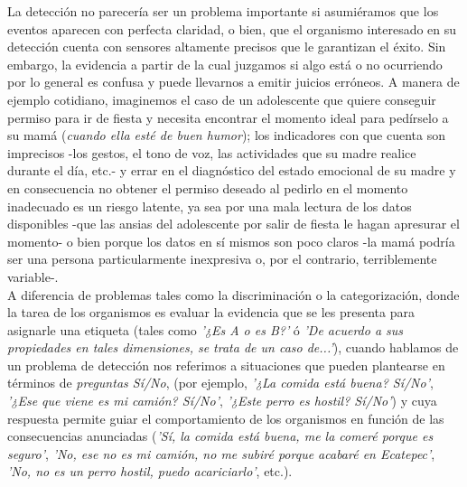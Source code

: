 La detección no parecería ser un problema importante si asumiéramos que los eventos aparecen con perfecta claridad, o bien, que el organismo interesado en su detección cuenta con sensores altamente precisos que le garantizan el éxito. Sin embargo, la evidencia a partir de la cual juzgamos si algo está o no ocurriendo por lo general es confusa y puede llevarnos a emitir juicios erróneos. A manera de ejemplo cotidiano, imaginemos el caso de un adolescente que quiere conseguir permiso para ir de fiesta y necesita encontrar el momento ideal para pedírselo a su mamá (\textit{cuando ella esté de buen humor}); los indicadores con que cuenta son imprecisos -los gestos, el tono de voz, las actividades que su madre realice durante el día, etc.- y errar en el diagnóstico del estado emocional de su madre y en consecuencia no obtener el permiso deseado al pedirlo en el momento inadecuado es un riesgo latente, ya sea por una mala lectura de los datos disponibles -que las ansias del adolescente por salir de fiesta le hagan apresurar el momento- o bien porque los datos en sí mismos son poco claros -la mamá podría ser una persona particularmente inexpresiva o, por el contrario, terriblemente variable-.\\ 

A diferencia de problemas tales como la discriminación o la categorización, donde la tarea de los organismos es evaluar la evidencia que se les presenta para asignarle una etiqueta (tales como \textit{'¿Es A o es B?'} ó \textit{'De acuerdo a sus propiedades en tales dimensiones, se trata de un caso de...'}), cuando hablamos de un problema de detección nos referimos a situaciones que pueden plantearse en términos de \textit{preguntas Sí/No}, (por ejemplo, \textit{'¿La comida está buena? Sí/No'}, \textit{'¿Ese que viene es mi camión? Sí/No'}, \textit{'¿Este perro es hostil? Sí/No'}) y cuya respuesta permite guiar el comportamiento de los organismos en función de las consecuencias anunciadas (\textit{'Sí, la comida está buena, me la comeré porque es seguro'}, \textit{'No, ese no es mi camión, no me subiré porque acabaré en Ecatepec'}, \textit{'No, no es un perro hostil, puedo acariciarlo'}, etc.).\\ 

